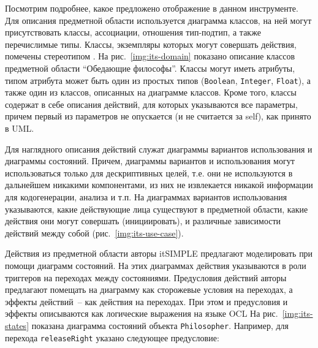 Посмотрим подробнее, какое предложено отображение в данном инструменте. Для описания предметной области используется диаграмма классов, на ней могут присутствовать классы, ассоциации, отношения тип-подтип, а также перечислимые типы. Классы, экземпляры которых могут совершать действия, помечены стереотипом .
На рис.~\ref{img:its-domain} показано описание классов предметной области ``Обедающие философы''. Классы могут иметь атрибуты, типом атрибута может быть один из простых типов (\texttt{Boolean}, \texttt{Integer}, \texttt{Float}), а также один из классов, описанных на диаграмме классов. Кроме того, классы содержат в себе описания действий, для которых указываются все параметры, причем первый из параметров не опускается (и не считается за self), как принято в UML. 

Для наглядного описания действий служат диаграммы вариантов использования и диаграммы состояний. Причем, диаграммы вариантов и использования могут использоваться только для дескриптивных целей, т.е.  они не используются в дальнейшем никакими компонентами, из них не извлекается никакой информации для кодогенерации, анализа и т.п. На диаграммах вариантов использования указываются, какие действующие лица существуют в предметной области, какие действия они могут совершать (инициировать), и различные зависимости действий между собой (рис.~\ref{img:its-use-case}).

Действия из предметной области авторы itSIMPLE предлагают моделировать при помощи диаграмм состояний. На этих диаграммах действия указываются в роли триггеров на переходах между  состояниями. Предусловия действий авторы предлагают помещать на диаграмму как сторожевые условия на переходах, а эффекты действий~-- как действия на переходах. При этом и предусловия и эффекты описываются как логические выражения на языке OCL
На рис.~\ref{img:its-states} показана диаграмма состояний объекта \texttt{Philosopher}.
Например, для перехода \texttt{releaseRight} указано следующее предусловие:

